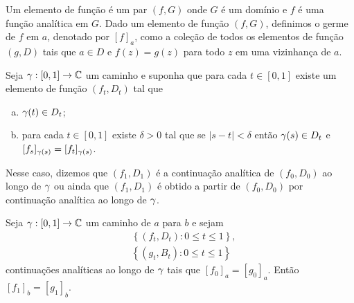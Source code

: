     \begin{definicao}
        \label{def-elemento-funcao}
        Um elemento de função é um par $(f, G)$ onde $G$ é um domínio e $f$
        é uma função analítica em $G$. Dado um elemento de função $(f,G)$, 
        definimos o germe de $f$ em $a$, denotado por $[f]_a$, 
        como a coleção de todos os elementos de função $(g,D)$ tais que 
        $a\in D$ e $f(z) = g(z)$ para todo $z$ em uma vizinhança de $a$.
    \end{definicao}


    \begin{definicao}
    \label{def-continuacao-analitica}
        Seja $\gamma: [0,1] \to \mathbb{C}$ um caminho e suponha que para cada
        $t\in[0,1]$ existe um elemento de função $(f_t, D_t)$ tal que
        \begin{enumerate}[(a)]
            \item $\gamma(t) \in D_t$;
            \item para cada $t\in[0,1]$ existe $\delta > 0$ tal que se $|s-t| < \delta$
            então $\gamma(s) \in D_t$ e $[f_s]_{\gamma(s)} = [f_t]_{\gamma(s)}$.
        \end{enumerate}
        Nesse caso, dizemos que $(f_1, D_1)$ é a continuação analítica de $(f_0,D_0)$ ao 
        longo de $\gamma$ ou ainda que $(f_1, D_1)$ é obtido a partir de $(f_0,D_0)$ por
        continuação analítica ao longo de $\gamma$.
    \end{definicao}


    \begin{proposicao}
    \label{prop-unicidade-continuacao-analitica-caminho}
        Seja $\gamma: [0,1]\to\mathbb{C}$ um caminho de $a$ para $b$ e sejam
        \begin{align*}
            &\left\{ (f_t, D_t): 0\leq t\leq 1 \right\}, \\
            &\left\{ (g_t, B_t): 0\leq t\leq 1 \right\}
        \end{align*}
        continuações analíticas ao longo de $\gamma$ tais que $[f_0]_a = [g_0]_a$.
        Então $[f_1]_b = [g_1]_b$.
    \end{proposicao}

